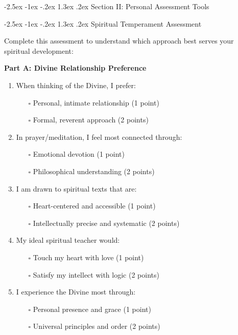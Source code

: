 \documentclass[12pt,twoside]{book}
\makeatletter
\renewcommand\section{\@startsection{section}{1}{\z@}%
{-2.5ex \@plus -1ex \@minus -.2ex}%
{1.3ex \@plus.2ex}%
{\normalfont\Large\bfseries}}
\makeatother
\begin{document}
\section{Section II: Personal Assessment Tools}
\label{sec:orgdb0a2e5}

\section{Spiritual Temperament Assessment}
\label{sec:org4f9fd4e}

Complete this assessment to understand which approach best serves your spiritual development:

\textbf{\textbf{Part A: Divine Relationship Preference}}

\begin{enumerate}
\item When thinking of the Divine, I prefer:
\begin{itemize}
\item[{$\square$}] Personal, intimate relationship (1 point)
\item[{$\square$}] Formal, reverent approach (2 points)
\end{itemize}

\item In prayer/meditation, I feel most connected through:
\begin{itemize}
\item[{$\square$}] Emotional devotion (1 point)
\item[{$\square$}] Philosophical understanding (2 points)
\end{itemize}

\item I am drawn to spiritual texts that are:
\begin{itemize}
\item[{$\square$}] Heart-centered and accessible (1 point)
\item[{$\square$}] Intellectually precise and systematic (2 points)
\end{itemize}

\item My ideal spiritual teacher would:
\begin{itemize}
\item[{$\square$}] Touch my heart with love (1 point)
\item[{$\square$}] Satisfy my intellect with logic (2 points)
\end{itemize}

\item I experience the Divine most through:
\begin{itemize}
\item[{$\square$}] Personal presence and grace (1 point)
\item[{$\square$}] Universal principles and order (2 points)
\end{itemize}
\end{enumerate}
\end{document}
